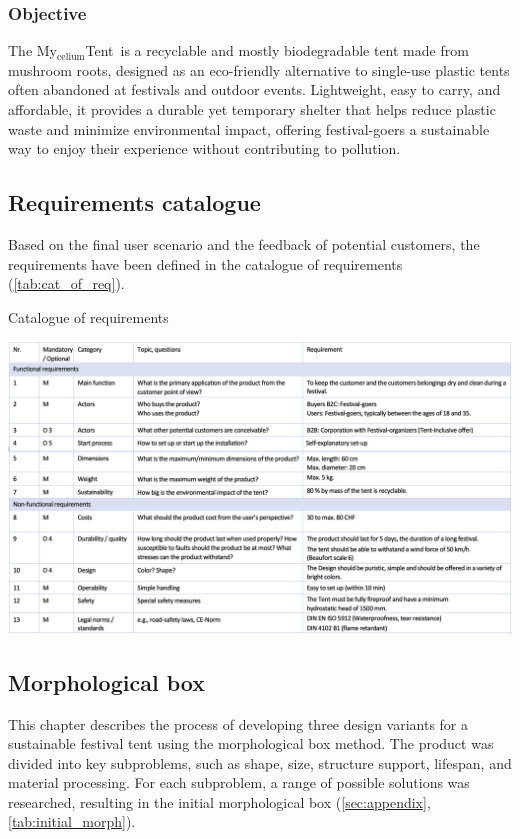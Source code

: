 \documentclass{article}
\newcommand{\myc}{My$_{\text{celium}}$Tent}
\begin{document}
\subsubsection{Objective}
The \myc\ is a recyclable and mostly biodegradable tent made from mushroom roots,
designed as an eco-friendly alternative to single-use plastic tents often abandoned at
festivals and outdoor events. Lightweight, easy to carry, and affordable, it provides a
durable yet temporary shelter that helps reduce plastic waste and minimize
environmental impact, offering festival-goers a sustainable way to enjoy their experience
without contributing to pollution.

\subsection{Requirements catalogue}
Based on the final user scenario and the feedback of potential customers, the
requirements have been defined in the catalogue of requirements (\autoref{tab:cat_of_req}).

\begin{table}[ht!]
    \centering
    \caption{Catalogue of requirements}
    \includegraphics[width=\textwidth]{media/req_cat_high_res.png}
    \label{tab:cat_of_req}
\end{table}

\subsection{Morphological box}
This chapter describes the process of developing three design variants for a sustainable
festival tent using the morphological box method. The product was divided into key
subproblems, such as shape, size, structure support, lifespan, and material processing.
For each subproblem, a range of possible solutions was researched, resulting in the
initial morphological box (\autoref{sec:appendix}, \autoref{tab:initial_morph}).
\end{document}
